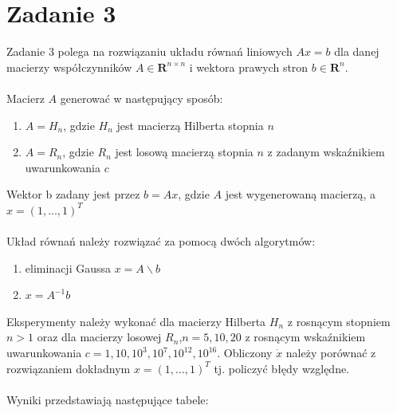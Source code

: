 \documentclass[12pt]{article}
\begin{document}
\section{Zadanie 3}
Zadanie 3 polega na rozwiązaniu układu równań liniowych $Ax = b$ dla danej macierzy współczynników $A \in \mathbf{R}^{n \times n}$ i wektora prawych stron $b \in\mathbf{R}^{n} $.
\\
\\
\noindent Macierz $A$ generować w następujący sposób:
\begin{enumerate}
	\item{$A = H_n$, gdzie $H_n$ jest macierzą Hilberta stopnia $n$}
	\item{$A = R_n$, gdzie $R_n$ jest losową macierzą stopnia $n$ z zadanym wskaźnikiem uwarunkowania $c$}
\end{enumerate}

\noindent Wektor b zadany jest przez $b=Ax$, gdzie $A$ jest wygenerowaną macierzą, a $x = (1, ..., 1)^T$
\\
\\
\noindent Układ równań należy rozwiązać za pomocą dwóch algorytmów:
\begin{enumerate}
	\item{eliminacji Gaussa $x=A \backslash b$}
	\item{$x = A^{-1}b$}
\end{enumerate}

\noindent Eksperymenty należy wykonać dla macierzy Hilberta $H_n$ z rosnącym stopniem $n > 1$ oraz dla macierzy losowej $R_n$,$n= 5, 10, 20$ z rosnącym wskaźnikiem uwarunkowania $c = 1, 10, 10^3, 10^7, 10^{12}, 10^{16}$. Obliczony $\dot x$ należy porównać z rozwiązaniem dokładnym $x = (1, ..., 1)^T$ tj. policzyć błędy względne.
\\
\\
\noindent Wyniki przedstawiają następujące tabele:
\end{document}
